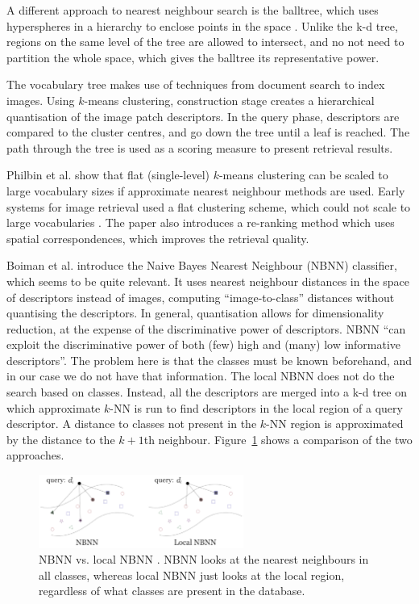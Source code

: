 \documentclass[10pt,a4paper]{article}
\begin{document}
A different approach to nearest neighbour search is the balltree, which uses
hyperspheres in a hierarchy to enclose points in the space
\cite{omohundro1989five}. Unlike the k-d tree, regions on the same level of the
tree are allowed to intersect, and no not need to partition the whole space,
which gives the balltree its representative power.

The vocabulary tree \cite{nister2006scalable} makes use of techniques from
document search to index images. Using $k$-means clustering, construction stage
creates a hierarchical quantisation of the image patch descriptors. In the query
phase, descriptors are compared to the cluster centres, and go down the tree
until a leaf is reached. The path through the tree is used as a scoring measure
to present retrieval results.

Philbin et al. \cite{philbin2007object} show that flat (single-level) $k$-means
clustering can be scaled to large vocabulary sizes if approximate nearest
neighbour methods are used. Early systems for image retrieval used a flat
clustering scheme, which could not scale to large vocabularies
\cite{sivic2003video}. The paper also introduces a re-ranking method which uses
spatial correspondences, which improves the retrieval quality.

Boiman et al. \cite{boiman2008defense} introduce the Naive Bayes Nearest
Neighbour (NBNN) classifier, which seems to be quite relevant. It uses nearest
neighbour distances in the space of descriptors instead of images, computing
``image-to-class'' distances without quantising the descriptors. In general,
quantisation allows for dimensionality reduction, at the expense of the
discriminative power of descriptors. NBNN ``can exploit the discriminative power
of both (few) high and (many) low informative descriptors''. The problem here is
that the classes must be known beforehand, and in our case we do not have that
information. The local NBNN \cite{mccann2012local} does not do the search based
on classes. Instead, all the descriptors are merged into a k-d tree on which
approximate $k$-NN is run to find descriptors in the local region of a query
descriptor. A distance to classes not present in the $k$-NN region is
approximated by the distance to the $k+1$th neighbour. Figure~\ref{fig:nbnncomp}
shows a comparison of the two approaches.

\begin{figure}
  \centering
  \includegraphics[width=0.6\textwidth]{images/nbnn_comp}
  \caption{NBNN vs. local NBNN \cite{mccann2012local}. NBNN looks at the nearest
  neighbours in all classes, whereas local NBNN just looks at the local region,
  regardless of what classes are present in the database.}
  \label{fig:nbnncomp}
\end{figure}
\end{document}
